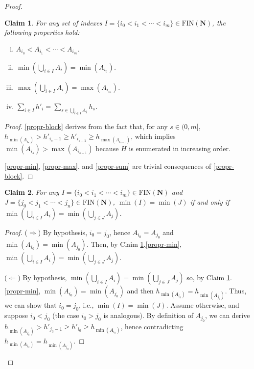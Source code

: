 \documentclass[a4paper,11pt]{article}
\newtheorem{claim}{Claim}
\newcommand\Nat{\mathbf{N}}
\newcommand\FIN{\mathrm{FIN}}
\begin{document}
\begin{proof}
\begin{claim}\label{cl:seq-propr}
For any set of indexes $I = \{i_0 < i_1 < \cdots < i_m\} \in \FIN(\Nat)$, the following properties hold:
\begin{enumerate}[(i)]
\item\label{propr-block} $A_{i_0} < A_{i_1} < \cdots < A_{i_m}$.
\item\label{propr-min} $\min(\bigcup_{i \in I} A_i) = \min(A_{i_0})$.
\item\label{propr-max} $\max(\bigcup_{i \in I} A_i) = \max(A_{i_m})$.
\item\label{propr-sum} $\sum_{i \in I} h'_i = \sum_{s \in \bigcup_{i \in I} A_i} h_s$.
\end{enumerate}

\end{claim}

\begin{proof}
\ref{propr-block} derives from the fact that, for any $s \in (0,m]$, $h_{\min(A_{i_s})} > h'_{i_s-1} \geq h'_{i_{s-1}} \geq h_{\max(A_{i_{s-1}})}$, which implies $\min(A_{i_s}) > \max(A_{i_{s-1}})$ because $H$ is enumerated in increasing order.

\ref{propr-min}, \ref{propr-max}, and \ref{propr-sum} are trivial consequences of \ref{propr-block}.
\end{proof}

\smallskip

\begin{claim}\label{propr:min-cons}
For any $I = \{i_0 < i_1 < \cdots < i_m\} \in \FIN(\Nat)$ and $J=\{j_0 < j_1 < \cdots < j_n\} \in \FIN(\Nat)$, $\min(I)=\min(J)$ if and only if $\min(\bigcup_{i \in I} A_i)=\min(\bigcup_{j \in J} A_j)$.
\end{claim}

\begin{proof}
($\Longrightarrow$) By hypothesis, $i_0 = j_0$, hence $A_{i_0} = A_{j_0}$ and $\min(A_{i_0}) = \min(A_{j_0})$. Then, by Claim \ref{cl:seq-propr}.\ref{propr-min}, $\min(\bigcup_{i \in I} A_i)=\min(\bigcup_{j \in J} A_j)$.

\smallskip

($\Longleftarrow$) By hypothesis, $\min(\bigcup_{i \in I} A_i)=\min(\bigcup_{j \in J} A_j)$ so, by Claim \ref{cl:seq-propr}.\ref{propr-min}, $\min(A_{i_0}) = \min(A_{j_0})$ and then $h_{\min(A_{i_0})} = h_{\min(A_{j_0})}$. Thus, we can show that $i_0 = j_0$, i.e., $\min(I) = \min(J)$. Assume otherwise, and suppose $i_0 < j_0$ (the case $i_0 > j_0$ is analogous). By definition of $A_{j_0}$, we can derive $h_{\min(A_{j_0})} > h'_{j_0-1} \geq h'_{i_0} \geq h_{\min(A_{i_0})}$, hence contradicting $h_{\min(A_{i_0})} = h_{\min(A_{j_0})}$.
\end{proof}


\end{proof}
\end{document}
